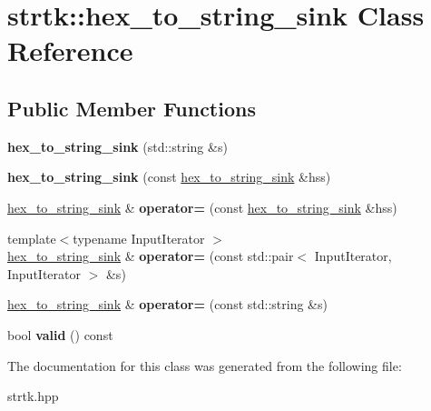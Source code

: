 \hypertarget{classstrtk_1_1hex__to__string__sink}{\section{strtk\-:\-:hex\-\_\-to\-\_\-string\-\_\-sink Class Reference}
\label{classstrtk_1_1hex__to__string__sink}
}
\subsection*{Public Member Functions}
\begin{DoxyCompactItemize}
\item 
\hypertarget{classstrtk_1_1hex__to__string__sink_ac48595e8b2f269fd3b9aa647019172c1}{{\bfseries hex\-\_\-to\-\_\-string\-\_\-sink} (std\-::string \&s)}\label{classstrtk_1_1hex__to__string__sink_ac48595e8b2f269fd3b9aa647019172c1}

\item 
\hypertarget{classstrtk_1_1hex__to__string__sink_a4be66604644b0f1540a6471419df161c}{{\bfseries hex\-\_\-to\-\_\-string\-\_\-sink} (const \hyperlink{classstrtk_1_1hex__to__string__sink}{hex\-\_\-to\-\_\-string\-\_\-sink} \&hss)}\label{classstrtk_1_1hex__to__string__sink_a4be66604644b0f1540a6471419df161c}

\item 
\hypertarget{classstrtk_1_1hex__to__string__sink_ab7b070dea47e95cd81674ce7591feb3d}{\hyperlink{classstrtk_1_1hex__to__string__sink}{hex\-\_\-to\-\_\-string\-\_\-sink} \& {\bfseries operator=} (const \hyperlink{classstrtk_1_1hex__to__string__sink}{hex\-\_\-to\-\_\-string\-\_\-sink} \&hss)}\label{classstrtk_1_1hex__to__string__sink_ab7b070dea47e95cd81674ce7591feb3d}

\item 
\hypertarget{classstrtk_1_1hex__to__string__sink_a8878d9c585d58853e692eda72db2a440}{{\footnotesize template$<$typename Input\-Iterator $>$ }\\\hyperlink{classstrtk_1_1hex__to__string__sink}{hex\-\_\-to\-\_\-string\-\_\-sink} \& {\bfseries operator=} (const std\-::pair$<$ Input\-Iterator, Input\-Iterator $>$ \&s)}\label{classstrtk_1_1hex__to__string__sink_a8878d9c585d58853e692eda72db2a440}

\item 
\hypertarget{classstrtk_1_1hex__to__string__sink_a8d437ad10292cd021ec20320eb726eb9}{\hyperlink{classstrtk_1_1hex__to__string__sink}{hex\-\_\-to\-\_\-string\-\_\-sink} \& {\bfseries operator=} (const std\-::string \&s)}\label{classstrtk_1_1hex__to__string__sink_a8d437ad10292cd021ec20320eb726eb9}

\item 
\hypertarget{classstrtk_1_1hex__to__string__sink_af97651791a55643dd907c514b5056ccb}{bool {\bfseries valid} () const }\label{classstrtk_1_1hex__to__string__sink_af97651791a55643dd907c514b5056ccb}

\end{DoxyCompactItemize}


The documentation for this class was generated from the following file\-:\begin{DoxyCompactItemize}
\item 
strtk.\-hpp\end{DoxyCompactItemize}
